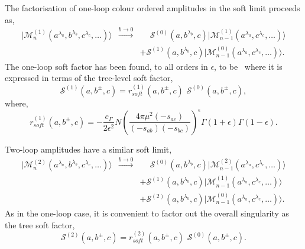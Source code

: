 \documentclass[paper,notoc,nohyper]{JHEP3}
\def\e{\epsilon}
\def\ket#1{|{#1}\rangle}
\def\sab{s_{ab}}
\def\sac{s_{ac}}
\def\sbc{s_{bc}}
\def\e{\epsilon}
\begin{document}
The factorisation of one-loop colour ordered amplitudes in the soft limit proceeds as,
\begin{eqnarray}
\ket{\mathcal{M}^{(1)}_n(a^{\lambda_a},b^{\lambda_b},c^{\lambda_c},\ldots)} &\stackrel{{b\rightarrow 0}}{\longrightarrow}&
\phantom{+}\mathcal{S}^{(0)}(a,b^{\lambda_{b}},c)\ket{\mathcal{M}^{(1)}_{n-1}(a^{\lambda_a},c^{\lambda_c},\ldots)}\nonumber \\ 
&& + \mathcal{S}^{(1)}(a,b^{\lambda_{b}},c)\ket{\mathcal{M}^{(0)}_{n-1}(a^{\lambda_a},c^{\lambda_c},\ldots)}.
\end{eqnarray}
The one-loop soft factor has been found, to all orders in $\epsilon$, 
to be~\cite{Bern:split1QCD,Catani:2000pi} where it is expressed in terms of the tree-level soft factor, 
\begin{equation}
	\mathcal{S}^{(1)}(a,b^\pm,c) = r^{(1)}_{soft}(a,b^\pm,c)\,\,\mathcal{S}^{(0)}(a,b^\pm,c),
\end{equation}
where,
\begin{equation}
	r^{(1)}_{soft}(a,b^\pm,c) = -\frac{c_\Gamma}{2\e^2}N\left( \frac{4\pi\mu^2
	(-\sac)}{(-\sab)(-\sbc)} \right)^\epsilon \Gamma(1+\e)\Gamma(1-\e).
\end{equation}


Two-loop amplitudes have a similar soft limit,
\begin{eqnarray}
\ket{\mathcal{M}^{(2)}_n(a^{\lambda_a},b^{\lambda_b},c^{\lambda_c},\ldots)} &\stackrel{{b\rightarrow 0}}{\longrightarrow}&
\phantom{+}\mathcal{S}^{(0)}(a,b^{\lambda_{b}},c)\ket{\mathcal{M}^{(2)}_{n-1}(a^{\lambda_a},c^{\lambda_c},\ldots)}\nonumber \\ 
&& + \mathcal{S}^{(1)}(a,b^{\lambda_{b}},c)\ket{\mathcal{M}^{(1)}_{n-1}(a^{\lambda_a},c^{\lambda_c},\ldots)}\nonumber \\
&& + \mathcal{S}^{(2)}(a,b^{\lambda_{b}},c)\ket{\mathcal{M}^{(0)}_{n-1}(a^{\lambda_a},c^{\lambda_c},\ldots)}.
\end{eqnarray}
As in the one-loop case, it is convenient to factor out the overall singularity as the tree soft factor,
\begin{equation}
	\mathcal{S}^{(2)}(a,b^\pm,c) = r^{(2)}_{soft}(a,b^\pm,c)\,\,\mathcal{S}^{(0)}(a,b^\pm,c).
\end{equation}
\end{document}
